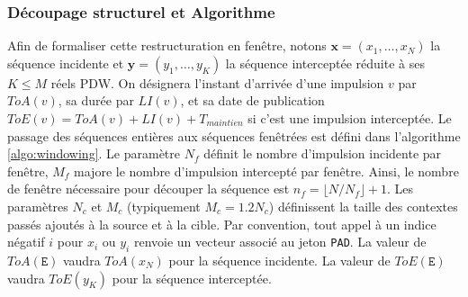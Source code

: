 \subsubsection{Découpage structurel et Algorithme}
Afin de formaliser cette restructuration en fenêtre, notons $\mathbf{x} = (x_1, \dots, x_N)$ la séquence incidente et $\mathbf{y} = (y_1, \dots, y_K)$ la séquence interceptée réduite à ses $K \leq M$ réels PDW. On désignera l'instant d'arrivée d'une impulsion $v$ par $ToA(v)$, sa durée par $LI(v)$, et sa date de publication $ToE(v) = ToA(v) + LI(v) + T_{maintien}$ si c'est une impulsion interceptée. Le passage des séquences entières aux séquences fenêtrées est défini dans l'algorithme \ref{algo:windowing}. Le paramètre $N_f$ définit le nombre d'impulsion incidente par fenêtre, $M_f$ majore le nombre d'impulsion intercepté par fenêtre. Ainsi, le nombre de fenêtre nécessaire pour découper la séquence est $n_f = \lfloor N / N_f \rfloor + 1$. Les paramètres $N_c$ et $M_c$ (typiquement $M_c = 1.2N_c$) définissent la taille des contextes passés ajoutés à la source et à la cible. Par convention, tout appel à un indice négatif $i$ pour $x_i$ ou $y_i$ renvoie un vecteur associé au jeton \texttt{PAD}. La valeur de $ToA(\texttt{E})$ vaudra $ToA(x_N)$ pour la séquence incidente. La valeur de $ToE(\texttt{E})$ vaudra $ToE(y_K)$ pour la séquence interceptée.\\

